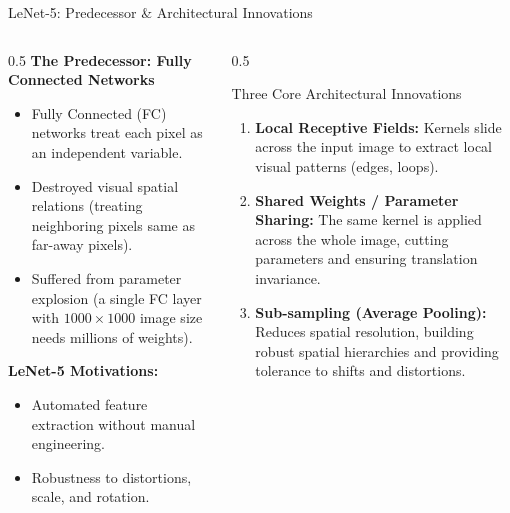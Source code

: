 \documentclass[aspectratio=169, 10pt]{beamer}
\begin{document}
\begin{frame}{LeNet-5: Predecessor & Architectural Innovations}
    \begin{columns}
        \begin{column}{0.5\textwidth}
            \textbf{The Predecessor: Fully Connected Networks}
            \begin{itemize}
                \item Fully Connected (FC) networks treat each pixel as an independent variable.
                \item Destroyed visual spatial relations (treating neighboring pixels same as far-away pixels).
                \item Suffered from parameter explosion (a single FC layer with $1000\times1000$ image size needs millions of weights).
            \end{itemize}
            \vspace{0.2cm}
            \textbf{LeNet-5 Motivations:}
            \begin{itemize}
                \item Automated feature extraction without manual engineering.
                \item Robustness to distortions, scale, and rotation.
            \end{itemize}
        \end{column}
        \begin{column}{0.5\textwidth}
            \begin{block}{Three Core Architectural Innovations}
                \begin{enumerate}
                    \item \textbf{Local Receptive Fields:} Kernels slide across the input image to extract local visual patterns (edges, loops).
                    \item \textbf{Shared Weights / Parameter Sharing:} The same kernel is applied across the whole image, cutting parameters and ensuring translation invariance.
                    \item \textbf{Sub-sampling (Average Pooling):} Reduces spatial resolution, building robust spatial hierarchies and providing tolerance to shifts and distortions.
                \end{enumerate}
            \end{block}
        \end{column}
    \end{columns}
\end{frame}
\end{document}
